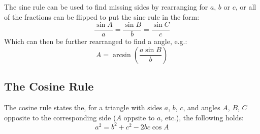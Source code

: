         The sine rule can be used to find missing sides by rearranging for $a$, $b$ or $c$, or all of the fractions can be flipped to put the sine rule in the form:
        \begin{equation}
            \frac{\sin A}{a}=\frac{\sin B}{b}=\frac{\sin C}{c}
        \end{equation}
        Which can then be further rearranged to find a angle, e.g.:
        \begin{equation}
            A=\arcsin\left(\frac{a\sin B}{b}\right)
        \end{equation}

    \subsection{The Cosine Rule}
        \begin{theorem} \label{thm:cosine_rule}
            The cosine rule states the, for a triangle with sides $a$, $b$, $c$, and angles $A$, $B$, $C$ opposite to the corresponding side ($A$ oppsite to $a$, etc.), the following holds:
            \begin{equation}
                a^2=b^2+c^2-2bc\cos A
            \end{equation}
        \end{theorem}
